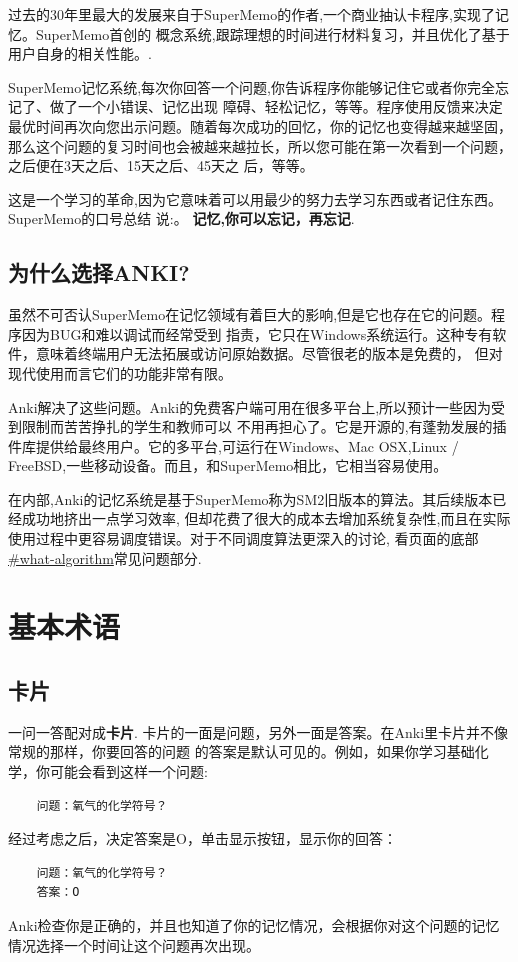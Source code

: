 \documentclass[a4paper]{book}
\begin{document}
过去的30年里最大的发展来自于SuperMemo的作者,一个商业抽认卡程序,实现了记忆。SuperMemo首创的 概念系统,跟踪理想的时间进行材料复习，并且优化了基于用户自身的相关性能。.

SuperMemo记忆系统,每次你回答一个问题,你告诉程序你能够记住它或者你完全忘记了、做了一个小错误、记忆出现 障碍、轻松记忆，等等。程序使用反馈来决定最优时间再次向您出示问题。随着每次成功的回忆，你的记忆也变得越来越坚固， 那么这个问题的复习时间也会被越来越拉长，所以您可能在第一次看到一个问题，之后便在3天之后、15天之后、45天之 后，等等。

这是一个学习的革命,因为它意味着可以用最少的努力去学习东西或者记住东西。SuperMemo的口号总结 说:。 \textbf{记忆,你可以忘记，再忘记}.

\section{为什么选择ANKI?}
虽然不可否认SuperMemo在记忆领域有着巨大的影响,但是它也存在它的问题。程序因为BUG和难以调试而经常受到 指责，它只在Windows系统运行。这种专有软件，意味着终端用户无法拓展或访问原始数据。尽管很老的版本是免费的， 但对现代使用而言它们的功能非常有限。

Anki解决了这些问题。Anki的免费客户端可用在很多平台上,所以预计一些因为受到限制而苦苦挣扎的学生和教师可以 不用再担心了。它是开源的,有蓬勃发展的插件库提供给最终用户。它的多平台,可运行在Windows、Mac OSX,Linux / FreeBSD,一些移动设备。而且，和SuperMemo相比，它相当容易使用。

在内部,Anki的记忆系统是基于SuperMemo称为SM2旧版本的算法。其后续版本已经成功地挤出一点学习效率, 但却花费了很大的成本去增加系统复杂性,而且在实际使用过程中更容易调度错误。对于不同调度算法更深入的讨论, 看页面的底部\url{#what-algorithm}常见问题部分.

\chapter{基本术语}\label{}

\section{卡片}
一问一答配对成\textbf{卡片}. 卡片的一面是问题，另外一面是答案。在Anki里卡片并不像常规的那样，你要回答的问题 的答案是默认可见的。例如，如果你学习基础化学，你可能会看到这样一个问题:

\begin{shaded}\begin{verbatim}
	问题：氧气的化学符号？
	\end{verbatim}\end{shaded}
经过考虑之后，决定答案是O，单击显示按钮，显示你的回答：
\begin{shaded}\begin{verbatim}
	问题：氧气的化学符号？
	答案：O
	\end{verbatim}\end{shaded}
Anki检查你是正确的，并且也知道了你的记忆情况，会根据你对这个问题的记忆情况选择一个时间让这个问题再次出现。
\end{document}
